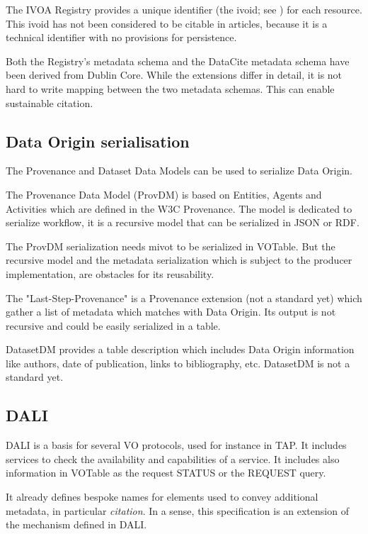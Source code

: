\documentclass[11pt,a4paper]{ivoa}
\begin{document}
The IVOA Registry provides a unique identifier (the ivoid; see \citet{2016ivoa.spec.0523D}) for each resource.  This ivoid has not been considered to be citable in articles, because it is a technical identifier with no provisions for persistence.

Both the Registry's metadata schema and the DataCite
\citep{std:DataCite31} metadata schema have been
derived from Dublin Core.  While the extensions differ in detail, it is not
hard to write mapping between the two metadata schemas.  This can enable
sustainable citation.

\subsection{Data Origin serialisation}
The Provenance \citep{2020ivoa.spec.0411S} and Dataset Data Models can be used to serialize Data Origin.

The Provenance Data Model (ProvDM) is based on Entities, Agents and Activities which are defined in the W3C Provenance. The model is dedicated to serialize workflow,
it is a recursive model that can be serialized in JSON or RDF.

The ProvDM serialization needs mivot to be serialized in VOTable. But the recursive model and the metadata serialization which is subject to the producer implementation, are obstacles for its reusability.


The "Last-Step-Provenance" is a Provenance extension (not a standard yet) which gather a list of metadata which matches with Data Origin. Its output is not recursive and could be easily serialized in a table.


DatasetDM provides a table description which includes Data Origin information like authors, date of publication, links to bibliography, etc.
DatasetDM is not a standard yet.

\subsection{DALI}
DALI \citep{2017ivoa.spec.0517D} is a basis for several VO protocols, used for instance in TAP. It includes services to  check the availability and capabilities of a service. It includes also information in VOTable as the request STATUS or the REQUEST query.

It already defines bespoke names for  elements used to convey additional metadata, in particular \emph{citation}.  In a sense, this specification is an extension of the mechanism defined in DALI.
\end{document}
